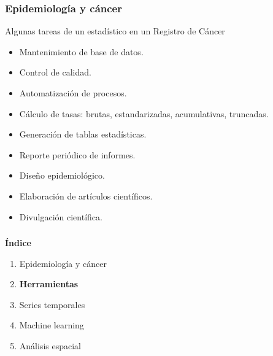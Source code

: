 \documentclass{beamer}
\begin{document}
\begin{frame}\frametitle{Epidemiología y cáncer}
	
	\begin{block}{Algunas tareas de un estadístico en un Registro de Cáncer}
		\begin{itemize}
			\item Mantenimiento de base de datos.
			\item Control de calidad.
			\item Automatización de procesos.
			\item Cálculo de tasas: brutas, estandarizadas, acumulativas, truncadas.
			\item Generación de tablas estadísticas.
			\item Reporte periódico de informes.
			\item Diseño epidemiológico.
			\item Elaboración de artículos científicos.
			\item Divulgación científica.
		\end{itemize}
	\end{block}	
\end{frame}


\begin{frame}\frametitle{}
	
	\Large{\textbf{Índice}}\\[2ex]
	\normalsize
	\begin{enumerate}
		\item Epidemiología y cáncer\\[2ex]
		\item \textbf{Herramientas}\\[2ex]
		\item Series temporales \\[2ex]
		\item Machine learning  \\[2ex]
		\item Análisis espacial \\[2ex]
	\end{enumerate}
	
\end{frame}
\end{document}
